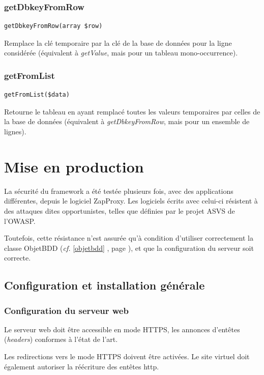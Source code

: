 \subsection{getDbkeyFromRow}
\begin{lstlisting}
getDbkeyFromRow(array $row)
\end{lstlisting}
Remplace la clé temporaire par la clé de la base de données pour la ligne considérée (équivalent à \textit{getValue}, mais pour un tableau mono-occurrence).

\subsection{getFromList}
\begin{lstlisting}
getFromList($data)
\end{lstlisting}
Retourne le tableau en ayant remplacé toutes les valeurs temporaires par celles de la base de données (équivalent à \textit{getDbkeyFromRow}, mais pour un ensemble de lignes).



\chapter{Mise en production}

La sécurité du framework a été testée plusieurs fois, avec des applications différentes, depuis le logiciel ZapProxy. Les logiciels écrits avec celui-ci résistent à des attaques dites opportunistes, telles que définies par le projet ASVS de l'OWASP.

Toutefois, cette résistance n'est assurée qu'à condition d'utiliser correctement la classe ObjetBDD (\textit{cf.} \ref{objetbdd} \textit{}, page \pageref{objetbdd}), et que la configuration du serveur soit correcte.

\section{Configuration et installation générale}

\subsection{Configuration du serveur web}

Le serveur web doit être accessible en mode HTTPS, les annonces d'entêtes (\textit{headers}) conformes à l'état de l'art.

Les redirections vers le mode HTTPS doivent être activées. Le site virtuel doit également autoriser la réécriture des entêtes http.

